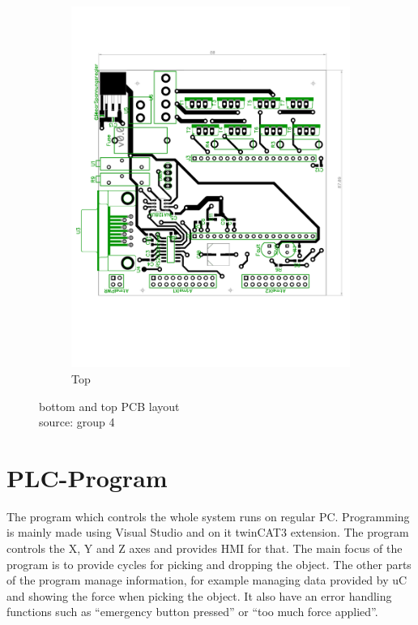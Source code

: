 \documentclass[a4paper,12pt]{scrreprt}
\begin{document}
\begin{figure} [H]
        \begin{subfigure}[b]{0.65\textwidth}
                \centering
                \includegraphics[width=1\textwidth]{pictures/PCB_TOP_v_2_0.pdf}
                \caption{Top}\label{fig:pcb_top}
        \end{subfigure}
        \caption[Bottom and top \acs{PCB} layout]{bottom and top \acs{PCB} layout\\
		source: group 4        
        }\label{fig:PCB layout}
  \end{figure}

\chapter{\acs{PLC}-Program}

The program which controls the whole system runs on regular PC. Programming is mainly made using Visual Studio and on it twinCAT3 extension. The program controls the X, Y and Z axes and provides \acs{HMI} for that. The main focus of the program is to provide cycles for picking and dropping the object. The other parts of the program manage information, for example managing data provided by \acs{uC} and showing the force when picking the object.  It also have an error handling functions such as \enquote{emergency button pressed} or \enquote{too much force applied}. 
\end{document}
